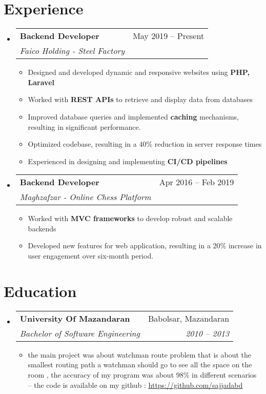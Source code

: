 \documentclass[a4paper,11pt]{article}
\makeatletter
\newcommand{\resumeItem}[1]{
  \item\small{#1}
}
\newcommand{\resumeItemListStart}{\begin{itemize}[rightmargin=0.11in]}
\newcommand{\resumeItemListEnd}{\end{itemize}}
\newcommand{\resumeQuadHeading}[4]{
  \item
  \begin{tabular*}{0.96\textwidth}[t]{l@{\extracolsep{\fill}}r}
    \textbf{#1} & #2 \\
    \textit{\small#3} & \textit{\small #4} \\
  \end{tabular*}
}
\newcommand{\resumeHeadingListStart}{
  \begin{itemize}[leftmargin=0.15in, label={}]
}
\newcommand{\resumeHeadingListEnd}{\end{itemize}}
\makeatother
\begin{document}

\section{Experience}
\resumeHeadingListStart{}
  \resumeQuadHeading{Backend Developer}{May 2019 -- Present}
  {Faico Holding - Steel Factory}{}
    \resumeItemListStart{}
      \resumeItem{Designed and developed dynamic and responsive websites using \textbf{PHP, Laravel}}
      \resumeItem{Worked with \textbf{REST APIs} to retrieve and display data from databases}
      \resumeItem{Improved database queries and implemented \textbf{caching} mechanisms, resulting in significant performance.}
      \resumeItem{Optimized codebase, resulting in a 40\% reduction in server response times}
      \resumeItem{Experienced in designing and implementing \textbf{CI/CD pipelines} }
    \resumeItemListEnd{}

  \resumeQuadHeading{Backend Developer}{Apr 2016 -- Feb 2019}
  {Maghzafzar - Online Chess Platform}{}
    \resumeItemListStart{}
      \resumeItem{Worked with \textbf{MVC frameworks} to develop robust and scalable backends}
	\resumeItem{Developed new features for web application, resulting in a 20\% increase in user engagement over six-month period.}
    \resumeItemListEnd{}


\resumeHeadingListEnd{}



\section{Education}
  \resumeHeadingListStart{}
    \resumeQuadHeading{University Of Mazandaran}{Babolsar, Mazandaran}
    {Bachelor of Software Engineering}{2010 – 2013}
	\begin{itemize}
	\item the main project was about watchman route problem that is about the smallest routing path a watchman should go to see all the space on the room , the accuracy of my program was about 98\% in different scenarios – the code is available on my github : \href{https://github.com/sajjadabd}{\uline{https://github.com/sajjadabd}}
	\end{itemize}
  \resumeHeadingListEnd{}





\end{document}
